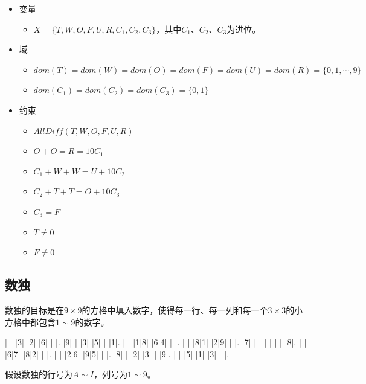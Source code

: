 \begin{itemize}
    \item 变量
          \begin{itemize}
              \item $ X = \{T, W, O, F, U, R, C_1, C_2, C_3\} $，其中$ C_1 $、$ C_2 $、$ C_3 $为进位。
          \end{itemize}
    \item 域
          \begin{itemize}
              \item $ dom(T) = dom(W) = dom(O) = dom(F) = dom(U) = dom(R) = \{0, 1, \cdots, 9\} $
              \item $ dom(C_1) = dom(C_2) = dom(C_3) = \{0, 1\} $
          \end{itemize}
    \item 约束
          \begin{itemize}
              \item $ AllDiff(T, W, O, F, U, R)  $
              \item $ O + O = R = 10C_1 $
              \item $ C_1 + W + W = U + 10C_2 $
              \item $ C_2 + T + T = O + 10C_3 $
              \item $ C_3 = F $
              \item $ T \neq 0 $
              \item $ F \neq 0 $
          \end{itemize}
\end{itemize}

\vspace{0.5cm}

\subsection{数独}

数独的目标是在$ 9 \times 9 $的方格中填入数字，使得每一行、每一列和每一个$ 3 \times 3 $的小方格中都包含$ 1 \sim 9 $的数字。\\

\begin{sudoku}
    | | |3| |2| |6| | |.
    |9| | |3| |5| | |1|.
    | | |1|8| |6|4| | |.
    | | |8|1| |2|9| | |.
    |7| | | | | | | |8|.
    | | |6|7| |8|2| | |.
    | | |2|6| |9|5| | |.
    |8| | |2| |3| | |9|.
    | | |5| |1| |3| | |.
\end{sudoku}

假设数独的行号为$ A \sim I $，列号为$ 1 \sim 9 $。

